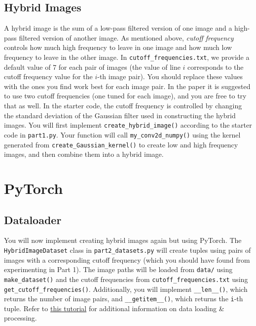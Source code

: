 \documentclass{article}
\begin{document}
\subsection{Hybrid Images}
A hybrid image is the sum of a low-pass filtered version of one image and a high-pass filtered version of another image. As mentioned above, \textit{cutoff frequency} controls how much high frequency to leave in one image and how much low frequency to leave in the other image. In \lstinline{cutoff_frequencies.txt}, we provide a default value of 7 for each pair of images (the value of line $i$ corresponds to the cutoff frequency value for the $i$-th image pair). You should replace these values with the ones you find work best for each image pair. In the paper it is suggested to use two cutoff frequencies (one tuned for each image), and you are free to try that as well. In the starter code, the cutoff frequency is controlled by changing the standard deviation of the Gaussian filter used in constructing the hybrid images. You will first implement \lstinline{create_hybrid_image()} according to the starter code in \lstinline{part1.py}. Your function will call \lstinline{my_conv2d_numpy()} using the kernel generated from \lstinline{create_Gaussian_kernel()} to create low and high frequency images, and then combine them into a hybrid image.


\section{PyTorch}

\subsection{Dataloader}
You will now implement creating hybrid images again but using PyTorch. The \lstinline{HybridImageDataset} class in \lstinline{part2_datasets.py} will create tuples using pairs of images with a corresponding cutoff frequency (which you should have found from experimenting in Part 1). The image paths will be loaded from \lstinline{data/} using \lstinline{make_dataset()} and the cutoff frequencies from \lstinline{cutoff_frequencies.txt} using \lstinline{get_cutoff_frequencies()}. Additionally, you will implement \lstinline{__len__()}, which returns the number of image pairs, and \lstinline{__getitem__()}, which returns the \lstinline{i}-th tuple. Refer to \href{https://pytorch.org/tutorials/beginner/data_loading_tutorial.html}{this tutorial} for additional information on data loading \& processing.
\end{document}
